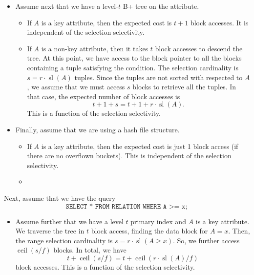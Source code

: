 \documentclass[a4paper, openany]{memoir}
\theoremstyle{definition}
\theoremstyle{plain}
\begin{document}
\begin{itemize}
    \item Assume next that we have a level-$t$ B+ tree on the attribute.
    \begin{itemize}
        \item If $A$ is a key attribute, then the expected cost is $t + 1$ block accesses. It is independent of the selection selectivity.
        \item If $A$ is a non-key attribute, then it takes $t$ block accesses to descend the tree. At this point, we have access to the block pointer to all the blocks containing a tuple satisfying the condition. The selection cardinality is $s = r \cdot \operatorname{sl}(A)$ tuples. Since the tuples are not sorted with respected to $A$, we assume that we must access $s$ blocks to retrieve all the tuples. In that case, the expected number of block accesses is
        \[t + 1 + s = t + 1 + r \cdot \operatorname{sl}(A).\]
        This is a function of the selection selectivity.
    \end{itemize}

    \item Finally, assume that we are using a hash file structure.
    \begin{itemize}
        \item If $A$ is a key attribute, then the expected cost is just 1 block access (if there are no overflown buckets). This is independent of the selection selectivity.
        \item 
    \end{itemize}
\end{itemize}

Next, assume that we have the query
\[\texttt{SELECT * FROM RELATION WHERE A >= x};\]
\begin{itemize}
    \item Assume further that we have a level $t$ primary index and $A$ is a key attribute. We traverse the tree in $t$ block access, finding the data block for $A = x$. Then, the range selection cardinality is $s = r \cdot \operatorname{sl}(A \geq x)$. So, we further access $\operatorname{ceil}(s/f)$ blocks. In total, we have
    \[t + \operatorname{ceil}(s/f) = t + \operatorname{ceil}(r \cdot \operatorname{sl}(A)/f)\]
    block accesses. This is a function of the selection selectivity.
\end{itemize}
\end{document}
